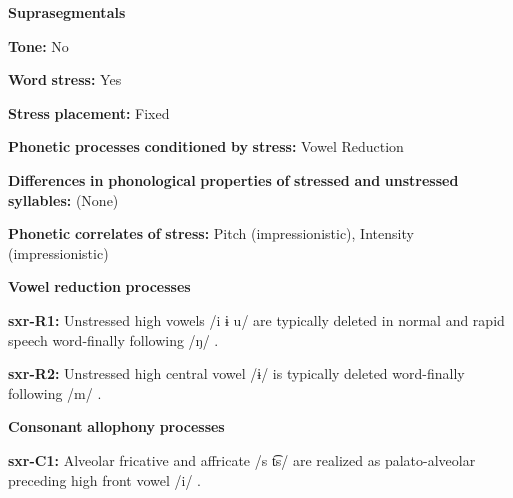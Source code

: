 \documentclass[output=paper]{langsci/langscibook}
\begin{document}
\begin{styleBody}
\textbf{Suprasegmentals}
\end{styleBody}

\begin{styleBody}
\textbf{Tone:} No
\end{styleBody}

\begin{styleBody}
\textbf{Word} \textbf{stress:} Yes
\end{styleBody}

\begin{styleBody}
\textbf{Stress} \textbf{placement:} Fixed
\end{styleBody}

\begin{styleBody}
\textbf{Phonetic} \textbf{processes} \textbf{conditioned} \textbf{by} \textbf{stress:} Vowel Reduction
\end{styleBody}

\begin{styleBody}
\textbf{Differences} \textbf{in} \textbf{phonological} \textbf{properties} \textbf{of} \textbf{stressed} \textbf{and} \textbf{unstressed} \textbf{syllables:} (None)
\end{styleBody}

\begin{styleBody}
\textbf{Phonetic} \textbf{correlates} \textbf{of} \textbf{stress:} Pitch (impressionistic), Intensity (impressionistic)
\end{styleBody}

\begin{styleBody}
\textbf{Vowel} \textbf{reduction} \textbf{processes}
\end{styleBody}

\begin{styleBody}
\textbf{sxr-R1:} Unstressed high vowels /i ɨ u/ are typically deleted in normal and rapid speech word-finally following /ŋ/ \citep[38]{Pan2012}.
\end{styleBody}

\begin{styleBody}
\textbf{sxr-R2:} Unstressed high central vowel /ɨ/ is typically deleted word-finally following /m/ \citep[39]{Pan2012}.
\end{styleBody}

\begin{styleBody}
\textbf{Consonant} \textbf{allophony} \textbf{processes}
\end{styleBody}

\begin{styleBody}
\textbf{sxr-C1:} Alveolar fricative and affricate /s t͡s/ are realized as palato-alveolar preceding high front vowel /i/ \citep[28]{Pan2012}.
\end{styleBody}
\end{document}
